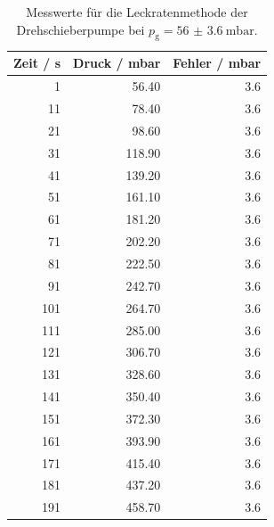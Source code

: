 \begin{table}[H]
  \centering
\caption{Messwerte für die Leckratenmethode der Drehschieberpumpe bei $p_\text{g} = \qty{56(3.6)}{\milli\bar}$.}
\label{tab:13} 
\begin{tabular}{rrr}
\toprule
Zeit / s & Druck / mbar & Fehler / mbar \\
\midrule
1 & 56.40 & 3.6 \\
11 & 78.40 & 3.6 \\
21 & 98.60 & 3.6 \\
31 & 118.90 & 3.6 \\
41 & 139.20 & 3.6 \\
51 & 161.10 & 3.6 \\
61 & 181.20 & 3.6 \\
71 & 202.20 & 3.6 \\
81 & 222.50 & 3.6 \\
91 & 242.70 & 3.6 \\
101 & 264.70 & 3.6 \\
111 & 285.00 & 3.6 \\
121 & 306.70 & 3.6 \\
131 & 328.60 & 3.6 \\
141 & 350.40 & 3.6 \\
151 & 372.30 & 3.6 \\
161 & 393.90 & 3.6 \\
171 & 415.40 & 3.6 \\
181 & 437.20 & 3.6 \\
191 & 458.70 & 3.6 \\
\bottomrule
\end{tabular}
\end{table}

